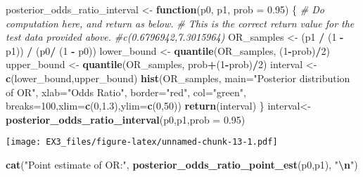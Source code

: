 \documentclass[
]{article}
\newenvironment{Shaded}{\begin{snugshade}}{\end{snugshade}}
\newcommand{\AttributeTok}[1]{\textcolor[rgb]{0.13,0.29,0.53}{#1}}
\newcommand{\CommentTok}[1]{\textcolor[rgb]{0.56,0.35,0.01}{\textit{#1}}}
\newcommand{\ControlFlowTok}[1]{\textcolor[rgb]{0.13,0.29,0.53}{\textbf{#1}}}
\newcommand{\DecValTok}[1]{\textcolor[rgb]{0.00,0.00,0.81}{#1}}
\newcommand{\FloatTok}[1]{\textcolor[rgb]{0.00,0.00,0.81}{#1}}
\newcommand{\FunctionTok}[1]{\textcolor[rgb]{0.13,0.29,0.53}{\textbf{#1}}}
\newcommand{\NormalTok}[1]{#1}
\newcommand{\OtherTok}[1]{\textcolor[rgb]{0.56,0.35,0.01}{#1}}
\newcommand{\SpecialCharTok}[1]{\textcolor[rgb]{0.81,0.36,0.00}{\textbf{#1}}}
\newcommand{\StringTok}[1]{\textcolor[rgb]{0.31,0.60,0.02}{#1}}
\begin{document}
\begin{Shaded}
\begin{Highlighting}[]
\NormalTok{posterior\_odds\_ratio\_interval }\OtherTok{\textless{}{-}} \ControlFlowTok{function}\NormalTok{(p0, p1, }\AttributeTok{prob =} \FloatTok{0.95}\NormalTok{) \{}
    \CommentTok{\# Do computation here, and return as below.}
    \CommentTok{\# This is the correct return value for the test data provided above.}
    \CommentTok{\#c(0.6796942,7.3015964)}
\NormalTok{    OR\_samples }\OtherTok{\textless{}{-}}\NormalTok{ (p1 }\SpecialCharTok{/}\NormalTok{ (}\DecValTok{1} \SpecialCharTok{{-}}\NormalTok{ p1)) }\SpecialCharTok{/}\NormalTok{ (p0}\SpecialCharTok{/}\NormalTok{ (}\DecValTok{1} \SpecialCharTok{{-}}\NormalTok{ p0))}
\NormalTok{    lower\_bound }\OtherTok{\textless{}{-}} \FunctionTok{quantile}\NormalTok{(OR\_samples, (}\DecValTok{1}\SpecialCharTok{{-}}\NormalTok{prob)}\SpecialCharTok{/}\DecValTok{2}\NormalTok{)}
\NormalTok{    upper\_bound }\OtherTok{\textless{}{-}} \FunctionTok{quantile}\NormalTok{(OR\_samples, prob}\SpecialCharTok{+}\NormalTok{(}\DecValTok{1}\SpecialCharTok{{-}}\NormalTok{prob)}\SpecialCharTok{/}\DecValTok{2}\NormalTok{)}
\NormalTok{    interval }\OtherTok{\textless{}{-}} \FunctionTok{c}\NormalTok{(lower\_bound,upper\_bound)}
    \FunctionTok{hist}\NormalTok{(OR\_samples, }\AttributeTok{main=}\StringTok{"Posterior distribution of OR"}\NormalTok{, }\AttributeTok{xlab=}\StringTok{"Odds Ratio"}\NormalTok{, }\AttributeTok{border=}\StringTok{"red"}\NormalTok{, }\AttributeTok{col=}\StringTok{"green"}\NormalTok{, }\AttributeTok{breaks=}\DecValTok{100}\NormalTok{,}\AttributeTok{xlim=}\FunctionTok{c}\NormalTok{(}\DecValTok{0}\NormalTok{,}\FloatTok{1.3}\NormalTok{),}\AttributeTok{ylim=}\FunctionTok{c}\NormalTok{(}\DecValTok{0}\NormalTok{,}\DecValTok{50}\NormalTok{))}
    \FunctionTok{return}\NormalTok{(interval)}
\NormalTok{\}}
\NormalTok{interval}\OtherTok{\textless{}{-}}\FunctionTok{posterior\_odds\_ratio\_interval}\NormalTok{(p0,p1,}\AttributeTok{prob =} \FloatTok{0.95}\NormalTok{)}
\end{Highlighting}
\end{Shaded}

\texttt{[image: EX3\_files/figure-latex/unnamed-chunk-13-1.pdf]}

\begin{Shaded}
\begin{Highlighting}[]
\FunctionTok{cat}\NormalTok{(}\StringTok{"Point estimate of OR:"}\NormalTok{, }\FunctionTok{posterior\_odds\_ratio\_point\_est}\NormalTok{(p0,p1), }\StringTok{"}\SpecialCharTok{\textbackslash{}n}\StringTok{"}\NormalTok{)}
\end{Highlighting}
\end{Shaded}
\end{document}
